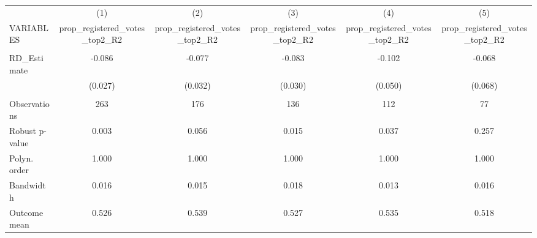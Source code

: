 \documentclass[]{article}
\begin{document}
\begin{tabular}{lccccc} \hline
 & (1) & (2) & (3) & (4) & (5) \\
VARIABLES & prop\_registered\_votes\_top2\_R2 & prop\_registered\_votes\_top2\_R2 & prop\_registered\_votes\_top2\_R2 & prop\_registered\_votes\_top2\_R2 & prop\_registered\_votes\_top2\_R2 \\ \hline
 &  &  &  &  &  \\
RD\_Estimate & -0.086 & -0.077 & -0.083 & -0.102 & -0.068 \\
 & (0.027) & (0.032) & (0.030) & (0.050) & (0.068) \\
 &  &  &  &  &  \\
Observations & 263 & 176 & 136 & 112 & 77 \\
Robust p-value & 0.003 & 0.056 & 0.015 & 0.037 & 0.257 \\
Polyn. order & 1.000 & 1.000 & 1.000 & 1.000 & 1.000 \\
Bandwidth & 0.016 & 0.015 & 0.018 & 0.013 & 0.016 \\
 Outcome mean & 0.526 & 0.539 & 0.527 & 0.535 & 0.518 \\ \hline
\end{tabular}
\end{document}
